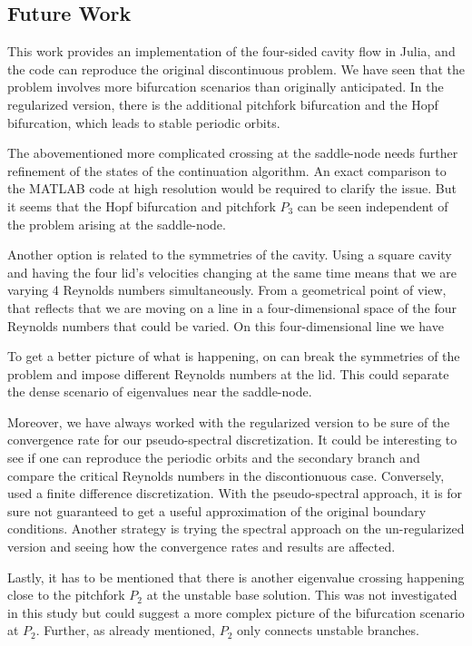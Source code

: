 \subsection{Future Work}

This work provides an implementation of the four-sided cavity flow in Julia,
and the code can reproduce the original discontinuous problem. We have seen
that the problem involves more bifurcation scenarios than originally
anticipated. In the regularized version, there is the additional pitchfork
bifurcation and the Hopf bifurcation, which leads to stable periodic orbits.

The abovementioned more complicated crossing at the saddle-node needs further
refinement of the states of the continuation algorithm. An exact comparison to
the MATLAB code at high resolution would be required to clarify the issue. But
it seems that the Hopf bifurcation and pitchfork $P_3$ can be seen independent of
the problem arising at the saddle-node. 

Another option is related to the symmetries of the cavity. Using a square
cavity and having the four lid's velocities changing at the same time means
that we are varying 4 Reynolds numbers simultaneously. From a geometrical point
of view, that reflects that we are moving on a line in a four-dimensional space
of the four Reynolds numbers that could be varied. On this four-dimensional
line we have 

To get a better picture of what is happening, on can break the symmetries of
the problem and impose different Reynolds numbers at the lid. This could
separate the dense scenario of eigenvalues near the saddle-node.

Moreover, we have always worked with the regularized version to be sure of the
convergence rate for our pseudo-spectral discretization. It could be
interesting to see if one can reproduce the periodic orbits and the secondary
branch and compare the critical Reynolds numbers in the discontionuous case.
Conversely, \citet{chen2013} used a finite difference discretization. With the
pseudo-spectral approach, it is for sure not guaranteed to get a useful
approximation of the original boundary conditions. Another strategy
is trying the spectral approach on the un-regularized version and seeing how
the convergence rates and results are affected.

Lastly, it has to be mentioned that there is another eigenvalue crossing
happening close to the pitchfork $P_2$ at the unstable base solution. This was
not investigated in this study but could suggest a more complex picture of the
bifurcation scenario at $P_2$. Further, as already mentioned, $P_2$ only
connects unstable branches.

